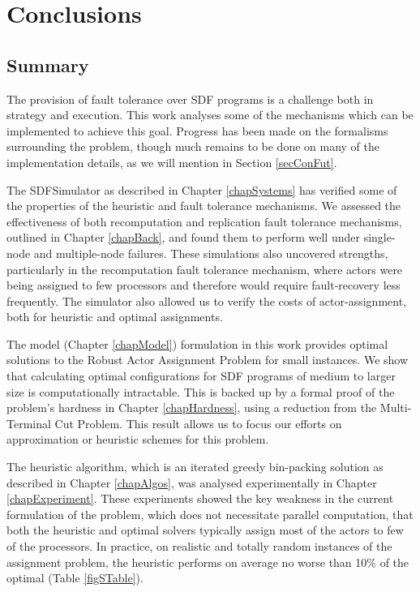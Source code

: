 \chapter{Conclusions}
\label{chapConclusion}

\section{Summary}
\label{secConSum}

The provision of fault tolerance over SDF programs is a challenge both in strategy and execution.
This work analyses some of the mechanisms which can be implemented to achieve this goal.
Progress has been made on the formalisms surrounding the problem, though much remains to be done on many of the implementation details, as we will mention in Section \ref{secConFut}.

The SDFSimulator as described in Chapter \ref{chapSystems} has verified some of the properties of the heuristic and fault tolerance mechanisms.
We assessed the effectiveness of both recomputation and replication fault tolerance mechanisms, outlined in Chapter \ref{chapBack}, and found them to perform well under single-node and multiple-node failures.
These simulations also uncovered strengths, particularly in the recomputation fault tolerance mechanism, where actors were being assigned to few processors and therefore would require fault-recovery less frequently.
The simulator also allowed us to verify the costs of actor-assignment, both for heuristic and optimal assignments.

The model (Chapter \ref{chapModel}) formulation in this work provides optimal solutions to the Robust Actor Assignment Problem for small instances.
We show that calculating optimal configurations for SDF programs of medium to larger size is computationally intractable.
This is backed up by a formal proof of the problem's hardness in Chapter \ref{chapHardness}, using a reduction from the Multi-Terminal Cut Problem.
This result allows us to focus our efforts on approximation or heuristic schemes for this problem.

The heuristic algorithm, which is an iterated greedy bin-packing solution as described in Chapter \ref{chapAlgos}, was analysed experimentally in Chapter \ref{chapExperiment}.
These experiments showed the key weakness in the current formulation of the problem, which does not necessitate parallel computation, that both the heuristic and optimal solvers typically assign most of the actors to few of the processors.
In practice, on realistic and totally random instances of the assignment problem, the heuristic performs on average no worse than 10\% of the optimal (Table \ref{figSTable}).

